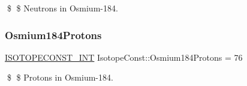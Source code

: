\$ \$ Neutrons in Osmium-\/184. \mbox{\label{group___isotope_const-_osmium-_os184_ga3bc4f9be71500e5591e7b887f6f1d521}} 
\subsubsection{\texorpdfstring{Osmium184\+Protons}{Osmium184Protons}}
{\footnotesize\ttfamily \mbox{\hyperlink{group___isotope_const-_macros_ga5f18360b3e99483a35c32d789e62621c}{I\+S\+O\+T\+O\+P\+E\+C\+O\+N\+S\+T\+\_\+\+I\+NT}} Isotope\+Const\+::\+Osmium184\+Protons = 76}

\$ \$ Protons in Osmium-\/184. 